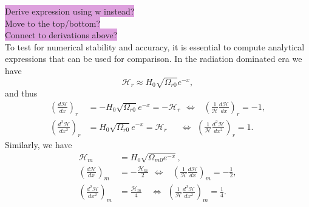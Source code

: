 \documentclass{aa}
\begin{document}
\colorbox{Plum}{Derive expression using w instead?} \\
\colorbox{Plum}{Move to the top/bottom?} \\
\colorbox{Plum}{Connect to derivations above?} \\
To test for numerical stability and accuracy, it is essential to compute analytical expressions that can be used for comparison. In the radiation dominated era we have
\begin{equation}
  \mathcal{H}_r \approx H_0\sqrt{\Omega_{r0}}e^{-x},
\end{equation}
and thus
\begin{align}
  \left(\frac{d\mathcal{H}}{dx}\right)_r &= -H_0\sqrt{\Omega_{r0}}e^{-x}=-\mathcal{H}_r 
  \hspace{5pt}\Leftrightarrow\hspace{9pt}\left(\frac{1}{\mathcal{H}}\frac{d\mathcal{H}}{dx}\right)_r=-1,
  \\
  \left(\frac{d^2\mathcal{H}}{dx^2}\right)_r &= H_0\sqrt{\Omega_{r0}}e^{-x}=\mathcal{H}_r
  \hspace{18pt}\Leftrightarrow\hspace{5pt}\left(\frac{1}{\mathcal{H}}\frac{d^2\mathcal{H}}{dx^2}\right)_r=1.
\end{align}
Similarly, we have
\begin{align}
  \mathcal{H}_m &= H_0\sqrt{\Omega_{m0}e^{-x}},
  \\
  \left(\frac{d\mathcal{H}}{dx}\right)_m &= -\frac{\mathcal{H}_m}{2} 
  \hspace{5pt}\Leftrightarrow\hspace{10pt}\left(\frac{1}{\mathcal{H}}\frac{d\mathcal{H}}{dx}\right)_m=-\frac{1}{2},
  \\
  \left(\frac{d^2\mathcal{H}}{dx^2}\right)_m &= \frac{\mathcal{H}_m}{4}
  \hspace{12pt}\Leftrightarrow\hspace{5pt}\left(\frac{1}{\mathcal{H}}\frac{d^2\mathcal{H}}{dx^2}\right)_m=\frac{1}{4}.
\end{align}
\end{document}
